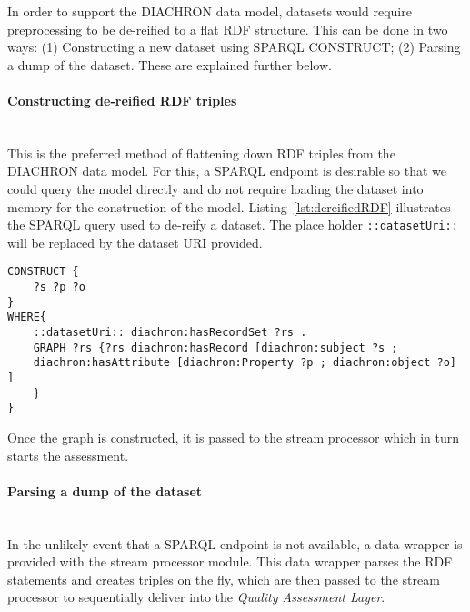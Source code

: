 In order to support the DIACHRON data model, datasets would require preprocessing to be de-reified to a flat RDF structure.
This can be done in two ways: (1) Constructing a new dataset using SPARQL CONSTRUCT; (2) Parsing a dump of the dataset.
These are explained further below.

\paragraph{Constructing de-reified RDF triples}~\\
This is the preferred method of flattening down RDF triples from the DIACHRON data model.
For this, a SPARQL endpoint is desirable so that we could query the model directly and do not require loading the dataset into memory for the construction of the model.
Listing~\ref{lst:dereifiedRDF} illustrates the SPARQL query used to de-reify a dataset.
The place holder \texttt{::datasetUri::} will be replaced by the dataset URI provided.
\begin{lstlisting}[language=sparql,caption="SPARQL Query to de-reify the DIACHRON data model into flat RDF",label=lst:dereifiedRDF]
CONSTRUCT {
	?s ?p ?o
}
WHERE{
	::datasetUri:: diachron:hasRecordSet ?rs .
	GRAPH ?rs {?rs diachron:hasRecord [diachron:subject ?s ;
	diachron:hasAttribute [diachron:Property ?p ; diachron:object ?o] ]
	}
}
\end{lstlisting}
Once the graph is constructed, it is passed to the stream processor which in turn starts the assessment.

\paragraph{Parsing a dump of the dataset}~\\
In the unlikely event that a SPARQL endpoint is not available, a data wrapper is provided with the stream processor module.
This data wrapper parses the RDF statements and creates triples on the fly, which are then passed to the stream processor to sequentially deliver into the \emph{Quality Assessment Layer}.

